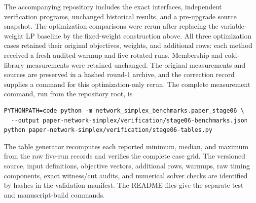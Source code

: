 The accompanying repository includes the exact interfaces, independent
verification programs, unchanged historical results, and a pre-upgrade
source snapshot. The optimization comparisons were rerun after replacing the
variable-weight LP baseline by the fixed-weight construction above. All three
optimization cases retained their original objectives, weights, and additional
rows; each method received a fresh audited warmup and five rotated runs.
Membership and cold-library measurements were retained unchanged. The original
measurements and sources are preserved in a hashed round-1 archive, and the
correction record supplies a command for this optimization-only rerun.
The complete measurement command, run from the repository root, is
\begin{verbatim}
PYTHONPATH=code python -m network_simplex_benchmarks.paper_stage06 \
  --output paper-network-simplex/verification/stage06-benchmarks.json
python paper-network-simplex/verification/stage06-tables.py
\end{verbatim}
The table generator recomputes each reported minimum, median, and maximum
from the raw five-run records and verifies the complete case grid.
The versioned source, input definitions, objective vectors, additional rows,
warmups, raw timing components, exact witness/cut audits, and numerical solver
checks are identified by hashes in the validation manifest. The README files
give the separate test and manuscript-build commands.
